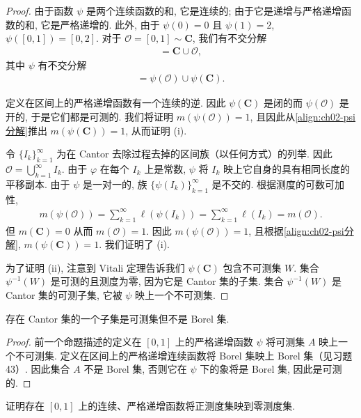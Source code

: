 \documentclass[../../main.tex]{subfiles}
\begin{document}
\begin{proof}
由于函数 $\psi$ 是两个连续函数的和, 它是连续的; 由于它是递增与严格递增函数的和, 它是严格递增的. 此外, 由于 $\psi(0)=0$ 且 $\psi(1)=2$, $\psi([0,1])=[0,2]$. 对于 $\mathcal{O}=[0,1]\sim\mathbf{C}$, 我们有不交分解
\begin{align*}
[0,1]=\mathbf{C}\cup\mathcal{O},
\end{align*}
其中 $\psi$ 有不交分解
\begin{align}
[0,2]=\psi(\mathcal{O})\cup\psi(\mathbf{C}).\label{align:ch02-psi分解}
\end{align}

定义在区间上的严格递增函数有一个连续的逆. 因此 $\psi(\mathbf{C})$ 是闭的而 $\psi(\mathcal{O})$ 是开的, 于是它们都是可测的. 我们将证明 $m(\psi(\mathcal{O}))=1$, 且因此从\eqref{align:ch02-psi分解}推出 $m(\psi(\mathbf{C}))=1$, 从而证明 (i).

令 $\{I_{k}\}_{k=1}^{\infty}$ 为在 Cantor 去除过程去掉的区间族（以任何方式）的列举. 因此 $\mathcal{O}=\bigcup_{k=1}^{\infty}I_{k}$. 由于 $\varphi$ 在每个 $I_{k}$ 上是常数, $\psi$ 将 $I_{k}$ 映上它自身的具有相同长度的平移副本. 由于 $\psi$ 是一对一的, 族 $\{\psi(I_{k})\}_{k=1}^{\infty}$ 是不交的. 根据测度的可数可加性,
\begin{align*}
m(\psi(\mathcal{O}))=\sum_{k=1}^{\infty}\ell(\psi(I_{k}))=\sum_{k=1}^{\infty}\ell(I_{k})=m(\mathcal{O}).
\end{align*}
但 $m(\mathbf{C})=0$ 从而 $m(\mathcal{O})=1$. 因此 $m(\psi(\mathcal{O}))=1$, 且根据\eqref{align:ch02-psi分解}, $m(\psi(\mathbf{C}))=1$. 我们证明了 (i).

为了证明 (ii), 注意到 Vitali 定理告诉我们 $\psi(\mathbf{C})$ 包含不可测集 $W$. 集合 $\psi^{-1}(W)$ 是可测的且测度为零, 因为它是 Cantor 集的子集. 集合 $\psi^{-1}(W)$ 是 Cantor 集的可测子集, 它被 $\psi$ 映上一个不可测集.
\end{proof}

\begin{proposition}\label{proposition:ch02-Cantor非Borel}
存在 Cantor 集的一个子集是可测集但不是 Borel 集.
\end{proposition}

\begin{proof}
前一个命题描述的定义在 $[0,1]$ 上的严格递增函数 $\psi$ 将可测集 $A$ 映上一个不可测集. 定义在区间上的严格递增连续函数将 Borel 集映上 Borel 集（见习题 43）. 因此集合 $A$ 不是 Borel 集, 否则它在 $\psi$ 下的象将是 Borel 集, 因此是可测的.
\end{proof}

\begin{exercise}\label{exercise:ch02-34}
证明存在 $[0,1]$ 上的连续、严格递增函数将正测度集映到零测度集.
\end{exercise}
\end{document}
